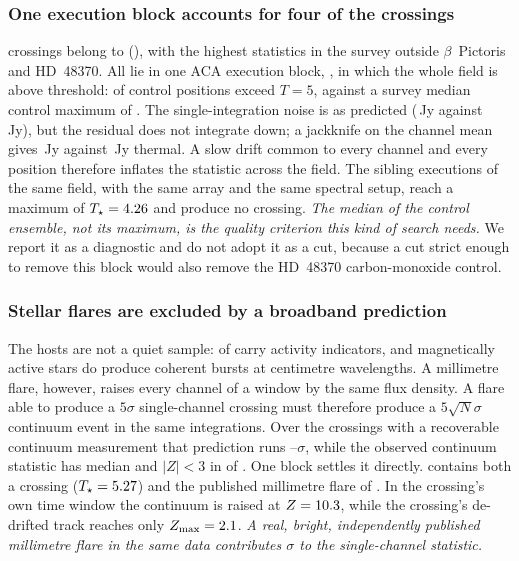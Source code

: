 \subsubsection{One execution block accounts for four of the crossings}
\label{sec:bdblock}

\BdNCross{} crossings belong to \BdStar{} (\BdAlias), with the highest
statistics in the survey outside $\beta$~Pictoris and HD~48370. All
\BdNCrossBlock{} lie in one ACA execution block, \texttt{\BdBlock}, in which
the whole field is above threshold: \BdNCtrlAbove{} of \BdNCtrl{} control
positions exceed $T=5$, against a survey median control maximum of
\BdSurvCtrlMed. The single-integration noise is as predicted
(\BdRmsMeas\,Jy against \BdRmsPred\,Jy), but the residual does not integrate
down; a jackknife on the channel mean gives \BdJack\,Jy against
\BdThermal\,Jy thermal. A slow drift common to every channel and every
position therefore inflates the statistic across the field. The
\BdNSibling{} sibling executions of the same field, with the same array and
the same spectral setup, reach a maximum of $T_\star=4.26{}$ and
produce no crossing. \emph{The median of the control ensemble, not its
maximum, is the quality criterion this kind of search needs.} We report it
as a diagnostic and do not adopt it as a cut, because a cut strict enough to
remove this block would also remove the HD~48370 carbon-monoxide control.

\subsubsection{Stellar flares are excluded by a broadband prediction}

The hosts are not a quiet sample: \HostNActive{} of \HostNTot{} carry
activity indicators, and magnetically active stars do produce coherent
bursts at centimetre wavelengths. A millimetre flare, however, raises every
channel of a window by the same flux density. A flare able to produce a
$5\sigma$ single-channel crossing must therefore produce a $5\sqrt{N}\sigma$
continuum event in the same integrations. Over the \FlNCont{} crossings with
a recoverable continuum measurement that prediction runs
\FlPredLo--\FlPredHi$\sigma$, while the observed continuum statistic has
median \FlObsMed{} and $|Z|<3$ in \FlNQuiet{} of \FlNCont. One block settles
it directly. \FlEgStar{} \texttt{\FlEgEb} contains both a crossing
($T_\star=5.27$) and the published millimetre flare of
\citet{MacGregor2020}. In the crossing's own time window the continuum is
raised at $Z=10.3$, while the crossing's de-drifted track reaches only
$Z_{\max}=2.1$. \emph{A real, bright, independently published
millimetre flare in the same data contributes \FlEgContrib$\sigma$ to the
single-channel statistic.}

